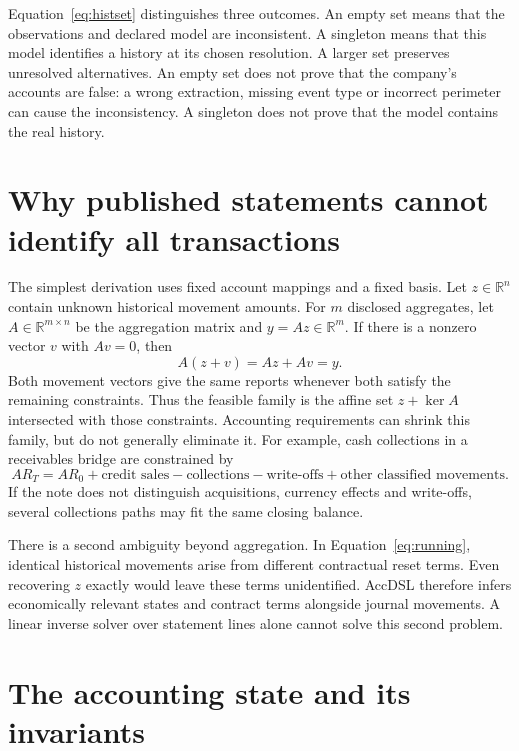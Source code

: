 Equation~\eqref{eq:histset} distinguishes three outcomes. An empty set means
that the observations and declared model are inconsistent. A singleton means
that this model identifies a history at its chosen resolution. A larger set
preserves unresolved alternatives. An empty set does not prove that the
company's accounts are false: a wrong extraction, missing event type or
incorrect perimeter can cause the inconsistency. A singleton does not prove
that the model contains the real history.



\section{Why published statements cannot identify all transactions}

The simplest derivation uses fixed account mappings and a fixed basis. Let
$z\in\mathbb{R}^n$ contain unknown historical movement amounts. For $m$
disclosed aggregates, let $A\in\mathbb{R}^{m\times n}$ be the aggregation
matrix and $y=Az\in\mathbb{R}^m$. If there is a nonzero vector $v$ with
$Av=0$, then
\[
 A(z+v)=Az+Av=y.
\]
Both movement vectors give the same reports whenever both satisfy the remaining
constraints. Thus the feasible family is the affine set $z+\ker A$ intersected
with those constraints. Accounting requirements can shrink this family, but
do not generally eliminate it. For example, cash collections in a receivables
bridge are constrained by
\[
 AR_T=AR_0+\text{credit sales}-\text{collections}
       -\text{write-offs}+\text{other classified movements}.
\]
If the note does not distinguish acquisitions, currency effects and write-offs,
several collections paths may fit the same closing balance.

There is a second ambiguity beyond aggregation. In
Equation~\eqref{eq:running}, identical historical movements arise from different
contractual reset terms. Even recovering $z$ exactly would leave these terms
unidentified. AccDSL therefore infers economically relevant states and
contract terms alongside journal movements. A linear inverse solver over
statement lines alone cannot solve this second problem.

\section{The accounting state and its invariants}

